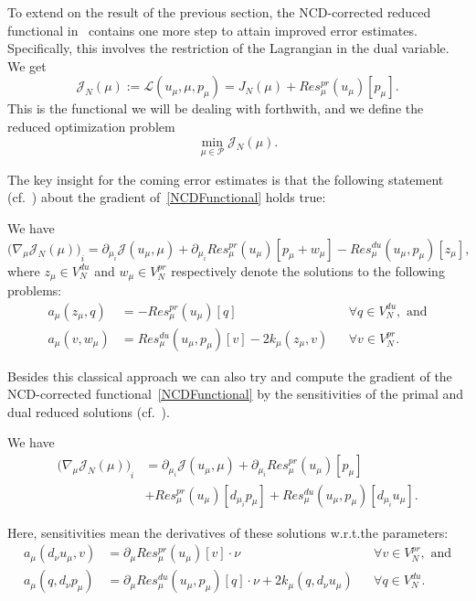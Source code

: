 To extend on the result of the previous section, the NCD-corrected reduced functional in~\cite[Subsection 3.3]{Keil2021} contains one more step to attain improved error estimates.
Specifically, this involves the restriction of the Lagrangian in the dual variable.
We get
\begin{equation}\label{NCDFunctional}
    \mathcal{J}_N(\mu) := \mathcal{L}(u_\mu, \mu, p_\mu) = J_N(\mu) + Res_\mu^{pr}(u_\mu)[p_\mu].
\end{equation}
This is the functional we will be dealing with forthwith, and we define the reduced optimization problem
\begin{equation}\label{ReducProb}
    \min\limits_{\mu \in \mathcal{P}} \mathcal{J}_N(\mu).
\end{equation}

The key insight for the coming error estimates is that the following statement (cf.~\cite[Proposition 3.3]{Keil2021}) about the gradient of~\eqref{NCDFunctional} holds true:
\begin{proposition}\label{NCDGradientProp}
    We have
    \begin{equation*}\label{NCDGradient}
        {\big( \nabla_\mu \mathcal{J}_N(\mu) \big)}_i = \partial_{\mu_i} \mathcal{J}(u_\mu, \mu) + \partial_{\mu_i} Res_\mu^{pr}(u_\mu)[p_\mu + w_\mu] - Res_\mu^{du}(u_\mu, p_\mu)[z_\mu],
    \end{equation*}
    where $z_\mu \in V_N^{du}$ and $w_\mu \in V_N^{pr}$ respectively denote the solutions to the following problems:
    \begin{align*}
        a_\mu(z_\mu, q) &= -Res_\mu^{pr}(u_\mu)[q] &&\forall q \in V_N^{du}, \text{ and} \\
        a_\mu(v, w_\mu) &= Res_\mu^{du}(u_\mu, p_\mu)[v] - 2 k_\mu(z_\mu, v) &&\forall v \in V_N^{pr}.
    \end{align*}
\end{proposition}

Besides this classical approach we can also try and compute the gradient of the NCD-corrected functional~\eqref{NCDFunctional} by the sensitivities of the primal and dual reduced solutions (cf.~\cite[Proposition 3.9]{Keil2021}).
\begin{proposition}\label{NCDGradientSensProp}
    We have
    \begin{align*}\label{NCDGradientSens}
        {\big( \nabla_\mu \mathcal{J}_N(\mu) \big)}_i &= \partial_{\mu_i} \mathcal{J}(u_\mu, \mu) + \partial_{\mu_i} Res_\mu^{pr}(u_\mu)[p_\mu] \\
        &+ Res_\mu^{pr}(u_\mu)[d_{\mu_i} p_\mu] + Res_\mu^{du}(u_\mu, p_\mu)[d_{\mu_i} u_\mu].
    \end{align*}
\end{proposition}
Here, sensitivities mean the derivatives of these solutions w.r.t.\@ the parameters:
\begin{align*}
    a_\mu(d_\nu u_\mu, v) &= \partial_\mu Res_\mu^{pr}(u_\mu)[v] \cdot \nu &&\forall v \in V_N^{pr}, \text{ and} \\
    a_\mu(q, d_\nu p_\mu) &= \partial_\mu Res_\mu^{du}(u_\mu, p_\mu)[q] \cdot \nu + 2 k_\mu(q, d_\nu u_\mu) &&\forall q \in V_N^{du}.
\end{align*}

